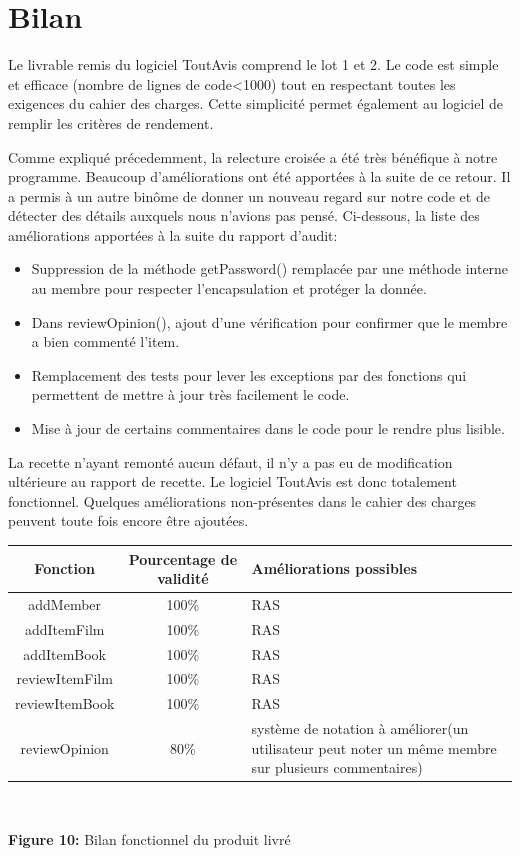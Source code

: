 \documentclass[12pt,a4paper]{report}
\begin{document}
\chapter*{Bilan}
\label{chapter:Bilan} %
Le livrable remis du logiciel ToutAvis comprend le lot 1 et 2. Le code est simple et efficace (nombre de lignes de code<1000) tout en respectant toutes les exigences du cahier des charges. Cette simplicité permet également au logiciel de remplir les critères de rendement.

Comme expliqué précedemment, la relecture croisée a été très bénéfique à notre programme. Beaucoup d'améliorations ont été apportées à la suite de ce retour. Il a permis à un autre binôme de donner un nouveau regard sur notre code et de détecter des détails auxquels nous n'avions pas pensé. Ci-dessous, la liste des améliorations apportées à la suite du rapport d'audit:
\begin{itemize}
	\item	Suppression de la méthode getPassword() remplacée par une méthode interne au membre pour respecter l'encapsulation et protéger la donnée.
	\item	Dans reviewOpinion(), ajout d'une vérification pour confirmer que le membre a bien commenté l'item.
	\item	Remplacement des tests pour lever les exceptions par des fonctions qui permettent de mettre à jour très facilement le code. 
	\item	Mise à jour de certains commentaires dans le code pour le rendre plus lisible.
\end{itemize}

La recette n'ayant remonté aucun défaut, il n'y a pas eu de modification ultérieure au rapport de recette.
Le logiciel ToutAvis est donc totalement fonctionnel. Quelques améliorations non-présentes dans le cahier des charges peuvent toute fois encore être ajoutées.

\begin{center}
\begin{tabular}{|c|c|p{6cm}|}
\hline 
Fonction & Pourcentage de validité & Améliorations possibles \\ 
\hline 
addMember & 100\% & RAS \\ 
\hline 
addItemFilm & 100\% & RAS \\ 
\hline 
addItemBook & 100\% & RAS \\ 
\hline 
reviewItemFilm & 100\% & RAS \\ 
\hline 
reviewItemBook & 100\% & RAS \\ 
\hline 
reviewOpinion & 80\% & système de notation à améliorer(un utilisateur peut noter un même membre sur plusieurs commentaires)  \\ 
\hline 
\end{tabular}\\
\end{center}
\begin{center}
\textbf{Figure 10: }Bilan fonctionnel du produit livré
\end{center}
\end{document}
